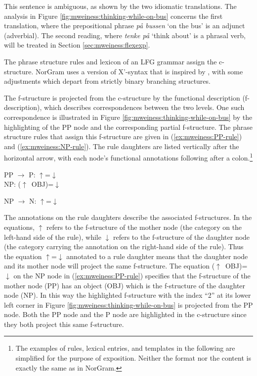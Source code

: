 \documentclass[output=paper]{langsci/langscibook}
\begin{document}
This sentence is ambiguous, as shown by the two idiomatic translations.
The analysis in Figure \ref{fig:mweiness:thinking-while-on-bus} concerns the first translation, where the prepositional phrase \textit{på bussen} `on the bus' is an adjunct (adverbial).
The second reading, where \textit{tenke på} `think about’ is a phrasal verb, will be treated in Section \ref{sec:mweiness:flexexp}.

The phrase structure rules and lexicon of an LFG grammar assign the c-struc\-ture.
NorGram uses a version of X’-syntax that is inspired by \citet{bresnanlfs}, with some adjustments which depart from strictly binary branching structures.

The f-structure is projected from the c-structure by the functional description (f-description), which describes correspondences between the two levels.
One such correspondence is illustrated in Figure \ref{fig:mweiness:thinking-while-on-bus} by the highlighting of the PP node and the corresponding partial f-structure.
The phrase structure rules that assign this f-structure are given in (\ref{ex:mweiness:PP-rule}) and (\ref{ex:mweiness:NP-rule}).
The rule daughters are listed vertically after the horizontal arrow, with each node's functional annotations following after a colon.\footnote{The examples of rules, lexical entries, and templates in the following are simplified for the purpose of exposition. Neither the format nor the content is exactly the same as in NorGram.}

\ea\label{ex:mweiness:PP-rule}
{\small 
PP	$\rightarrow$	P: $\uparrow$=$\downarrow$ \\
\hspace{2.3em} NP: ($\uparrow$~OBJ)=$\downarrow$
}
\z

\ea\label{ex:mweiness:NP-rule}
{\small 
NP	$\rightarrow$	N: $\uparrow$=$\downarrow$ \\
}
\z

The annotations on the rule daughters describe the associated f-structures.
In the equations, $\uparrow$ refers to the f-structure of the mother node (the category on the left-hand side of the rule), while $\downarrow$ refers to the f-structure of the daughter node (the category carrying the annotation on the right-hand side of the rule).
Thus the equation $\uparrow$=$\downarrow$ annotated to a rule daughter means that the daughter node and its mother node will project the same f-structure.
The equation ($\uparrow$~OBJ)=$\downarrow$ on the NP node in (\ref{ex:mweiness:PP-rule}) specifies that the f-structure of the mother node (PP) has an object (OBJ) which is the f-structure of the daughter node (NP).
In this way the highlighted f-structure with the index ``2'' at its lower left corner in Figure \ref{fig:mweiness:thinking-while-on-bus} is projected from the PP node.
Both the PP node and the P node are highlighted in the c-structure since they both project this same f-structure.
\end{document}
